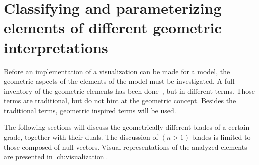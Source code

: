 \section{Classifying and parameterizing elements of different geometric interpretations}
\label{ch:research}

Before an implementation of a visualization can be made for a model, the geometric aspects of the elements of the model must be investigated.  A full inventory of the geometric elements has been done~\cite[Chapter 3]{Pottmann}, but in different terms.  Those terms are traditional, but do not hint at the geometric concept.  Besides the traditional terms, geometric inspired terms will be used.  

The following sections will discuss the geometrically different blades of a certain grade, together with their duals.  The discussion of $(n>1)$-blades is limited to those composed of null vectors.  Visual representations of the analyzed elements are presented in \autoref{ch:visualization}.
%
%    


